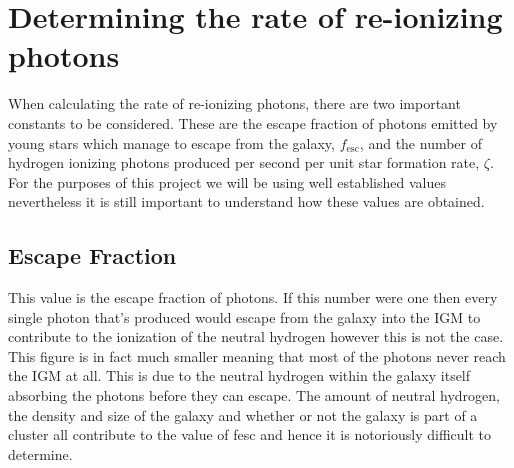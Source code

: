 
\section{Determining the rate of re-ionizing photons} %
\label{sec:determining_the_rate_of_re_ionizing_photons}
	When calculating the rate of re-ionizing photons, there are two important constants to be considered. These are the escape fraction of photons emitted by young stars which manage to escape from the galaxy, $f_\text{esc}$, and the number of hydrogen ionizing photons produced per second per unit star formation rate, $\zeta$. For the purposes of this project we will be using well established values nevertheless it is still important to understand how these values are obtained.

	\subsection{Escape Fraction} %
	\label{sub:escape_fraction}
		This value is the escape fraction of photons. If this number were one then every single photon that’s produced would escape from the galaxy into the IGM to contribute to the ionization of the neutral hydrogen however this is not the case. This figure is in fact much smaller meaning that most of the photons never reach the IGM at all. This is due to the neutral hydrogen within the galaxy itself absorbing the photons before they can escape. The amount of neutral hydrogen, the density and size of the galaxy and whether or not the galaxy is part of a cluster all contribute to the value of fesc and hence it is notoriously difficult to determine.

